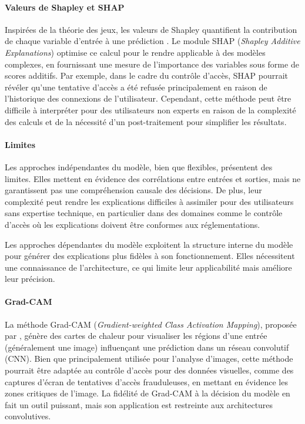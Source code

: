 \paragraph{Valeurs de Shapley et SHAP}  
Inspirées de la théorie des jeux, les valeurs de Shapley quantifient la contribution de chaque variable d’entrée à une prédiction \citep{lundberg2017shap}. Le module SHAP (\textit{Shapley Additive Explanations}) optimise ce calcul pour le rendre applicable à des modèles complexes, en fournissant une mesure de l’importance des variables sous forme de scores additifs. Par exemple, dans le cadre du contrôle d’accès, SHAP pourrait révéler qu’une tentative d’accès a été refusée principalement en raison de l’historique des connexions de l’utilisateur. Cependant, cette méthode peut être difficile à interpréter pour des utilisateurs non experts en raison de la complexité des calculs et de la nécessité d’un post-traitement pour simplifier les résultats.

\paragraph{Limites}  
Les approches indépendantes du modèle, bien que flexibles, présentent des limites. Elles mettent en évidence des corrélations entre entrées et sorties, mais ne garantissent pas une compréhension causale des décisions. De plus, leur complexité peut rendre les explications difficiles à assimiler pour des utilisateurs sans expertise technique, en particulier dans des domaines comme le contrôle d’accès où les explications doivent être conformes aux réglementations.


Les approches dépendantes du modèle exploitent la structure interne du modèle pour générer des explications plus fidèles à son fonctionnement. Elles nécessitent une connaissance de l’architecture, ce qui limite leur applicabilité mais améliore leur précision.

\paragraph{Grad-CAM}  
La méthode Grad-CAM (\textit{Gradient-weighted Class Activation Mapping}), proposée par \cite{selvaraju2017gradcam}, génère des cartes de chaleur pour visualiser les régions d’une entrée (généralement une image) influençant une prédiction dans un réseau convolutif (CNN). Bien que principalement utilisée pour l’analyse d’images, cette méthode pourrait être adaptée au contrôle d’accès pour des données visuelles, comme des captures d’écran de tentatives d’accès frauduleuses, en mettant en évidence les zones critiques de l’image. La fidélité de Grad-CAM à la décision du modèle en fait un outil puissant, mais son application est restreinte aux architectures convolutives.


